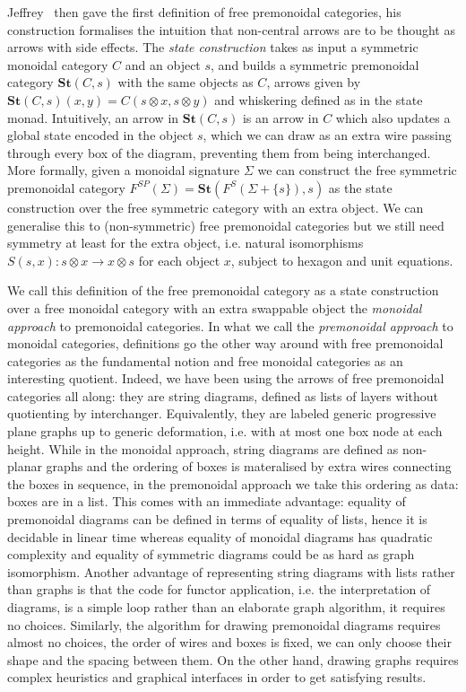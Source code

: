 Jeffrey~\cite{Jeffrey97} then gave the first definition of free premonoidal categories, his construction formalises the intuition that non-central arrows are to be thought as arrows with side effects.
The \emph{state construction} takes as input a symmetric monoidal category $C$ and an object $s$, and builds a symmetric premonoidal category $\mathbf{St}(C, s)$ with the same objects as $C$, arrows given by $\mathbf{St}(C, s)(x, y) = C(s \otimes x, s \otimes y)$ and whiskering defined as in the state monad.
Intuitively, an arrow in $\mathbf{St}(C, s)$ is an arrow in $C$ which also updates a global state encoded in the object $s$, which we can draw as an extra wire passing through every box of the diagram, preventing them from being interchanged.
More formally, given a monoidal signature $\Sigma$ we can construct the free symmetric premonoidal category $F^{SP}(\Sigma) = \mathbf{St}(F^S(\Sigma + \{ s \}), s)$ as the state construction over the free symmetric category with an extra object.
We can generalise this to (non-symmetric) free premonoidal categories but we still need symmetry at least for the extra object, i.e. natural isomorphisms $S(s, x) : s \otimes x \to x \otimes s$ for each object $x$, subject to hexagon and unit equations.

We call this definition of the free premonoidal category as a state construction over a free monoidal category with an extra swappable object the \emph{monoidal approach} to premonoidal categories.
In what we call the \emph{premonoidal approach} to monoidal categories, definitions go the other way around with free premonoidal categories as the fundamental notion and free monoidal categories as an interesting quotient.
Indeed, we have been using the arrows of free premonoidal categories all along: they are string diagrams, defined as lists of layers without quotienting by interchanger.
Equivalently, they are labeled generic progressive plane graphs up to generic deformation, i.e. with at most one box node at each height.
While in the monoidal approach, string diagrams are defined as non-planar graphs and the ordering of boxes is materalised by extra wires connecting the boxes in sequence, in the premonoidal approach we take this ordering as data: boxes are in a list.
This comes with an immediate advantage: equality of premonoidal diagrams can be defined in terms of equality of lists, hence it is decidable in linear time whereas equality of monoidal diagrams has quadratic complexity and equality of symmetric diagrams could be as hard as graph isomorphism.
Another advantage of representing string diagrams with lists rather than graphs is that the code for functor application, i.e. the interpretation of diagrams, is a simple  loop rather than an elaborate graph algorithm, it requires no choices.
Similarly, the algorithm for drawing premonoidal diagrams requires almost no choices, the order of wires and boxes is fixed, we can only choose their shape and the spacing between them.
On the other hand, drawing graphs requires complex heuristics and graphical interfaces in order to get satisfying results.

